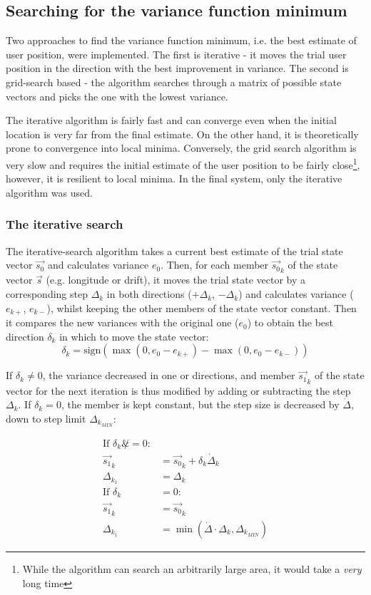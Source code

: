 \subsection{Searching for the variance function minimum}
Two approaches to find the variance function minimum, i.e. the best estimate of user position, were implemented. The first is iterative - it moves the trial user position in the direction with the best improvement in variance. The second is grid-search based - the algorithm searches through a matrix of possible state vectors and picks the one with the lowest variance.

The iterative algorithm is fairly fast and can converge even when the initial location is very far from the final estimate. On the other hand, it is theoretically prone to convergence into local minima. Conversely, the grid search algorithm is very slow and requires the initial estimate of the user position to be fairly close\footnote{While the algorithm can search an arbitrarily large area, it would take a \textit{very} long time}, however, it is resilient to local minima. In the final system, only the iterative algorithm was used.

\subsubsection{The iterative search}
The iterative-search algorithm takes a current best estimate of the trial state vector $\Vec{s_0}$ and calculates variance $e_0$. Then, for each member $\Vec{s_0}_k$ of the state vector $\Vec{s}$ (e.g. longitude or drift), it moves the trial state vector by a corresponding step $\Delta_k$ in both directions ($+\Delta_k$, $-\Delta_k$) and calculates variance ($e_{k+}$, $e_{k-}$), whilst keeping the other members of the state vector constant. Then it compares the new variances with the original one ($e_0$) to obtain the best direction $\delta_k$ in which to move the state vector:
\begin{equation*}
    \delta_k = \text{sign}(\max(0, e_0 - e_{k+}) - \max(0, e_0 - e_{k-}))
\end{equation*}

If $\delta_k \not = 0$, the variance decreased in one or directions, and member $\Vec{s_1}_k$ of the state vector for the next iteration is thus modified by adding or subtracting the step $\Delta_k$. If $\delta_k = 0$, the member is kept constant, but the step size is decreased by $\dot\Delta$, down to step limit $\Delta_{k_{MIN}}$:

\begin{align*}
    \text{If } \delta_k \not &= 0: \\
        \Vec{s_1}_k &= \Vec{s_0}_k + \delta_k \dot \Delta_k \\
        \Delta_{k_1} &= \Delta_{k} \\
    \text{If } \delta_k &= 0: \\
        \Vec{s_1}_k &= \Vec{s_0}_k \\
        \Delta_{k_1} &= \min(\dot\Delta \cdot \Delta_k, \Delta_{k_{MIN}})
\end{align*}

